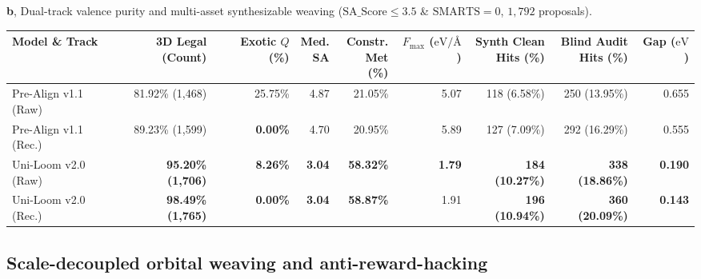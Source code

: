 \documentclass[11pt,a4paper]{article}
\begin{document}
\begin{table}[!t]
  \vspace{6pt}
  \textbf{b}, Dual-track valence purity and multi-asset synthesizable weaving ($\text{SA\_Score} \le 3.5$ \& $\text{SMARTS} = 0$, $1{,}792$ proposals).\\[2pt]
  \begin{tabular}{lrrrrrrrr}
    \toprule
    Model \& Track & \shortstack[r]{3D Legal\\(Count)} & \shortstack[r]{Exotic\\$Q$ (\%)} & \shortstack[r]{Med.\\SA} & \shortstack[r]{Constr.\\Met (\%)} & \shortstack[r]{$F_{\max}$\\($\text{eV}/\text{\AA}$)} & \shortstack[r]{Synth Clean\\Hits (\%)} & \shortstack[r]{Blind Audit\\Hits (\%)} & \shortstack[r]{Gap\\($\text{eV}$)} \\
    \midrule
    Pre-Align v1.1 (Raw) & 81.92\% (1,468) & 25.75\% & 4.87 & 21.05\% & 5.07 & 118 (6.58\%) & 250 (13.95\%) & 0.655 \\
    Pre-Align v1.1 (Rec.) & 89.23\% (1,599) & \textbf{0.00\%} & 4.70 & 20.95\% & 5.89 & 127 (7.09\%) & 292 (16.29\%) & 0.555 \\
    Uni-Loom v2.0 (Raw) & \textbf{95.20\% (1,706)} & \textbf{8.26\%} & \textbf{3.04} & \textbf{58.32\%} & \textbf{1.79} & \textbf{184 (10.27\%)} & \textbf{338 (18.86\%)} & \textbf{0.190} \\
    Uni-Loom v2.0 (Rec.) & \textbf{98.49\% (1,765)} & \textbf{0.00\%} & \textbf{3.04} & \textbf{58.87\%} & 1.91 & \textbf{196 (10.94\%)} & \textbf{360 (20.09\%)} & \textbf{0.143} \\
    \bottomrule
  \end{tabular}
\end{table}

\subsection*{Scale-decoupled orbital weaving and anti-reward-hacking}
\end{document}
